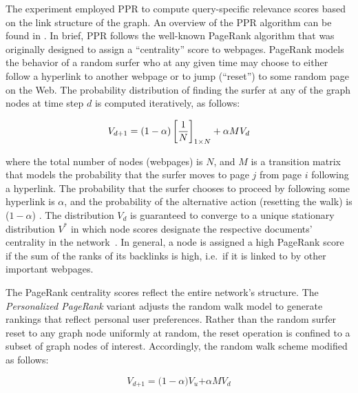 \documentclass[10pt,letterpaper]{article}
\begin{document}
The experiment employed PPR\cite{page1999pagerank} to compute query-specific relevance scores based on the link structure of the graph. An overview of the PPR algorithm can be found in \cite{jeh2003scaling}. In brief, PPR follows the well-known PageRank algorithm that was originally designed to assign a ``centrality'' score to webpages. PageRank models the behavior of a random surfer who at any given time may choose to either follow a hyperlink to another webpage or to jump (``reset'') to some random page on the Web. The probability distribution of finding the surfer at any of the graph nodes at time step $d$ is computed iteratively, as follows: 

\begin{equation} \label{GrindEQ__1_} 
V_{d+1} = (1-\alpha) \left[{1 \over N}\right]_{1 \times N} + \alpha M V_d 
\end{equation} 

\noindent where the total number of nodes (webpages) is $N$, and $M$ is a transition matrix that models the probability that the surfer moves to page $j$ from page $i$ following a hyperlink. The probability that the surfer chooses to proceed by following some hyperlink is $\alpha $, and the probability of the alternative action (resetting the walk) is ($\mathrm{1-}\alpha $) . The distribution $V_d$ is guaranteed to converge to a unique stationary distribution $V^{\mathrm{*}}$ in which node scores designate the respective documents' centrality in the network~\cite{page1999pagerank}. In general, a node is assigned a high PageRank score if the sum of the ranks of its backlinks is high, i.e.~if it is linked to by other important webpages.

The PageRank centrality scores reflect the entire network's structure. The\textit{ Personalized PageRank} variant adjusts the random walk model to generate rankings that reflect personal user preferences. Rather than the random surfer reset to any graph node uniformly at random, the reset operation is confined to a subset of graph nodes of interest. Accordingly, the random walk scheme modified as follows: 

\begin{equation} \label{GrindEQ__3_} 
V_{d\mathrm{+1}}\mathrm{=(1-}\alpha \mathrm{)}V_u\mathrm{+}\alpha M V_d 
\end{equation} 
\end{document}

